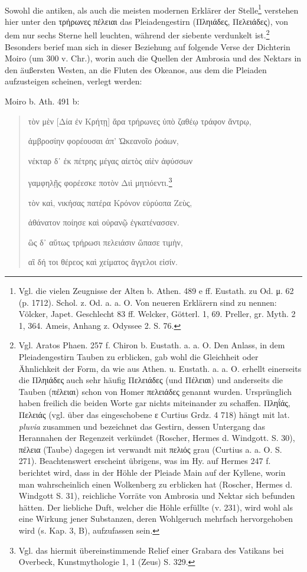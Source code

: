 \documentclass[a4paper, 11pt, oneside]{article}
\begin{document}
\paragraph{}
Sowohl die antiken, als auch die meisten modernen Erklärer der Stelle\footnote{Vgl. die vielen Zeugnisse der Alten b. Athen. 489 e ff. Eustath. zu Od. μ. 62 (p. 1712). Schol. z. Od. a. a. O. Von neueren Erklärern sind zu nennen: Völcker, Japet. Geschlecht 83 ff. Welcker, Götterl. 1, 69. Preller, gr. Myth. 2 1, 364. Ameis, Anhang z. Odyssee 2. S. 76.} verstehen hier unter den τρήρωνες πέλειαι das Pleiadengestirn (Πληιάδες, Πελειάδες), von dem nur sechs Sterne hell leuchten, während der siebente verdunkelt ist.\footnote{Vgl. Aratos Phaen. 257 f. Chiron b. Eustath. a. a. O. Den Anlass, in dem Pleiadengestirn Tauben zu erblicken, gab wohl die Gleichheit oder Ähnlichkeit der Form, da wie aus Athen. u. Eustath. a. a. O. erhellt einerseits die Πληιάδες auch sehr häufig Πελειάδες (und Πέλειαι) und anderseits die Tauben (πέλειαι) schon von Homer πελειάδες genannt wurden. Ursprünglich haben freilich die beiden Worte gar nichts miteinander zu schaffen. Πληΐάς, Πελειάς (vgl. über das eingeschobene ε Curtius Grdz. 4 718) hängt mit lat. \emph{pluvia} zusammen und bezeichnet das Gestirn, dessen Untergang das Herannahen der Regenzeit verkündet (Roscher, Hermes d. Windgott. S. 30), πέλεια (Taube) dagegen ist verwandt mit πελιός grau (Curtius a. a. O. S. 271). Beachtenswert erscheint übrigens, was im Hy. auf Hermes 247 f. berichtet wird, dass in der Höhle der Pleiade Main auf der Kyllene, worin man wahrscheinlich einen Wolkenberg zu erblicken hat (Roscher, Hermes d. Windgott S. 31), reichliche Vorräte von Ambrosia und Nektar sich befunden hätten. Der liebliche Duft, welcher die Höhle erfüllte (v. 231), wird wohl als eine Wirkung jener Substanzen, deren Wohlgeruch mehrfach hervorgehoben wird (s. Kap. 3, B), aufzufassen sein.} Besonders berief man sich in dieser Beziehung auf folgende Verse der Dichterin Moiro (um 300 v. Chr.), worin auch die Quellen der Ambrosia und des Nektars in den äußersten Westen, an die Fluten des Okeanos, aus dem die Pleiaden aufzusteigen scheinen, verlegt werden:

Moiro b. Ath. 491 b:
\begin{quotation}
τὸν μὲν [Δία ἐν Κρήτῃ] ἄρα τρήρωνες ὑπὸ ζαθέῳ τράφον ἄντρῳ,

ἀμβροσίην φορέουσαι ἀπ' Ὠκεανοῖο ῥοάων,

νέκταρ δ᾽ ἐκ πέτρης μέγας αἰετὸς αἰὲν ἀφύσσων

γαμφηλῇς φορέεσκε ποτὸν Διὶ μητιόεντι.\footnote{Vgl. das hiermit übereinstimmende Relief einer Grabara des Vatikans bei Overbeck, Kunstmythologie 1, 1 (Zeus) S. 329.}

\bigskip

τὸν καὶ, νικήσας πατέρα Κρόνον εὐρύοπα Ζεὺς,

ἀθάνατον ποίησε καὶ οὐρανῷ ἐγκατένασσεν.

ὣς δ᾽ αὕτως τρήρωσι πελειάσιν ὥπασε τιμὴν,

αἳ δή τοι θέρεος καὶ χείματος ἄγγελοι εἰσίν.
\end{quotation}
\end{document}
